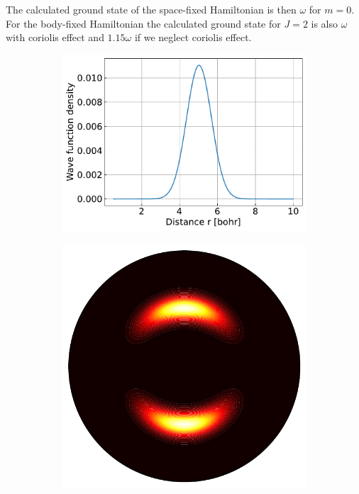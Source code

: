 \documentclass{article}
\begin{document}
    The calculated ground state of the space-fixed Hamiltonian is then $\omega$ for $m = 0$.
    For the body-fixed Hamiltonian the calculated ground state for $J = 2$ is also $\omega$ with 
    coriolis effect and $1.15\omega$ if we neglect coriolis effect.

    \begin{figure}[H]
        \centering
        \begin{subfigure}{.4\linewidth}
            \centering
            \includegraphics[width=\linewidth]{harmonic_iso_distance.pdf}
        \end{subfigure}
        \begin{subfigure}{.4\linewidth}
            \centering
            \includegraphics[width=\linewidth]{harmonic_iso_wave.pdf}

\end{subfigure}
\end{figure}
\end{document}
